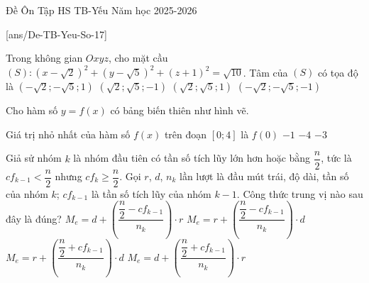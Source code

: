 \begin{name}
{Đề Ôn Tập HS TB-Yếu}
{Năm học 2025-2026}
\end{name}

[ans/De-TB-Yeu-So-17]
\TN
\begin{ex} %
	Trong không gian $Oxyz$, cho mặt cầu $(S)\colon \left(x-\sqrt{2}\right)^2+\left(y-\sqrt{5}\right)^2+\left(z+1\right)^2=\sqrt{10}$. Tâm của $(S)$ có tọa độ là
	\choice
	{$\left(-\sqrt{2};-\sqrt{5};1\right)$}
	{\True $\left(\sqrt{2};\sqrt{5};-1\right)$}
	{$\left(\sqrt{2};\sqrt{5};1\right)$}
	{$\left(-\sqrt{2};-\sqrt{5};-1\right)$}
\end{ex}

\begin{ex}%
	Cho hàm số $y=f(x)$ có bảng biến thiên như hình vẽ.
	\begin{center}
	\end{center}
	Giá trị nhỏ nhất của hàm số $f(x)$ trên đoạn $\left[0;4\right]$ là
	\choice
	{$f(0)$}
	{$-1$}
	{$-4$}
	{\True $-3$}
\end{ex}

\begin{ex}%
	Giả sử nhóm $k$ là nhóm đầu tiên có tần số tích lũy lớn hơn hoặc bằng $\dfrac{n}{2}$, tức là $cf_{k-1}<\dfrac{n}{2}$ nhưng $cf_k\ge \dfrac{n}{2}$. Gọi $r$, $d$, $n_k$ lần lượt là đầu mút trái, độ dài, tần số của nhóm $k$; $cf_{k-1}$ là tần số tích lũy của nhóm $k-1$. Công thức trung vị nào sau đây là đúng?
	\choice
	{$M_e=d+\left(\dfrac{\dfrac{n}{2}-cf_{k-1}}{n_k}\right)\cdot r$}
	{\True $M_e=r+\left(\dfrac{\dfrac{n}{2}-cf_{k-1}}{n_k}\right)\cdot d$}
	{$M_e=r+\left(\dfrac{\dfrac{n}{2}+cf_{k-1}}{n_k}\right)\cdot d$}
	{$M_e=d+\left(\dfrac{\dfrac{n}{2}+cf_{k-1}}{n_k}\right)\cdot r$}
\end{ex}

